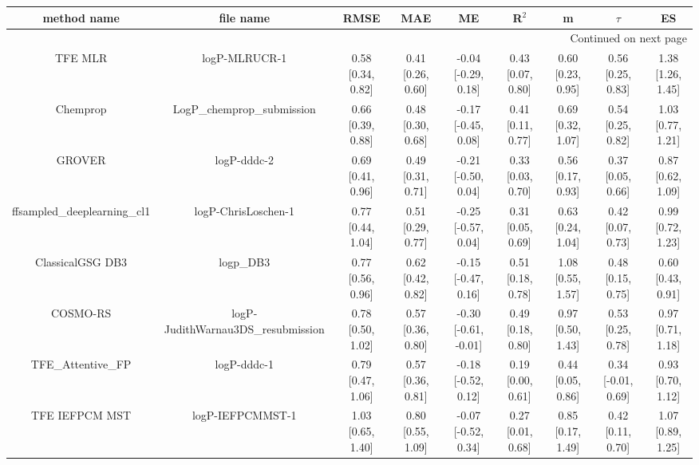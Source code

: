 \documentclass{article}
\begin{document}
\begin{center}
\scriptsize
\begin{longtable}{|ccccccccc|}
\toprule
                method name &                                   file name &               RMSE &                MAE &                    ME &              R$^2$ &                     m &                $\tau$ &                    ES \\
\midrule
\endhead
\midrule
\multicolumn{9}{r}{{Continued on next page}} \\
\midrule
\endfoot

\bottomrule
\endlastfoot
                    TFE MLR &                               logP-MLRUCR-1 &  0.58 [0.34, 0.82] &  0.41 [0.26, 0.60] &   -0.04 [-0.29, 0.18] &  0.43 [0.07, 0.80] &     0.60 [0.23, 0.95] &     0.56 [0.25, 0.83] &     1.38 [1.26, 1.45] \\
                   Chemprop &                  LogP\_chemprop\_submission &  0.66 [0.39, 0.88] &  0.48 [0.30, 0.68] &   -0.17 [-0.45, 0.08] &  0.41 [0.11, 0.77] &     0.69 [0.32, 1.07] &     0.54 [0.25, 0.82] &     1.03 [0.77, 1.21] \\
                     GROVER &                                 logP-dddc-2 &  0.69 [0.41, 0.96] &  0.49 [0.31, 0.71] &   -0.21 [-0.50, 0.04] &  0.33 [0.03, 0.70] &     0.56 [0.17, 0.93] &     0.37 [0.05, 0.66] &     0.87 [0.62, 1.09] \\
 ffsampled_deeplearning_cl1 &                         logP-ChrisLoschen-1 &  0.77 [0.44, 1.04] &  0.51 [0.29, 0.77] &   -0.25 [-0.57, 0.04] &  0.31 [0.05, 0.69] &     0.63 [0.24, 1.04] &     0.42 [0.07, 0.73] &     0.99 [0.72, 1.23] \\
           ClassicalGSG DB3 &                                   logp\_DB3 &  0.77 [0.56, 0.96] &  0.62 [0.42, 0.82] &   -0.15 [-0.47, 0.16] &  0.51 [0.18, 0.78] &     1.08 [0.55, 1.57] &     0.48 [0.15, 0.75] &     0.60 [0.43, 0.91] \\
                   COSMO-RS &          logP-JudithWarnau3DS\_resubmission &  0.78 [0.50, 1.02] &  0.57 [0.36, 0.80] &  -0.30 [-0.61, -0.01] &  0.49 [0.18, 0.80] &     0.97 [0.50, 1.43] &     0.53 [0.25, 0.78] &     0.97 [0.71, 1.18] \\
           TFE_Attentive_FP &                                 logP-dddc-1 &  0.79 [0.47, 1.06] &  0.57 [0.36, 0.81] &   -0.18 [-0.52, 0.12] &  0.19 [0.00, 0.61] &     0.44 [0.05, 0.86] &    0.34 [-0.01, 0.69] &     0.93 [0.70, 1.12] \\
             TFE IEFPCM MST &                            logP-IEFPCMMST-1 &  1.03 [0.65, 1.40] &  0.80 [0.55, 1.09] &   -0.07 [-0.52, 0.34] &  0.27 [0.01, 0.68] &     0.85 [0.17, 1.49] &     0.42 [0.11, 0.70] &     1.07 [0.89, 1.25] \\

\end{longtable}
\end{center}
\end{document}
